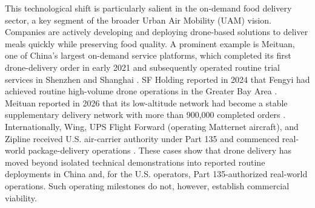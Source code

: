 \documentclass[final,3p,authoryear]{elsarticle}
\begin{document}
This technological shift is particularly salient in the on-demand food delivery sector, a key segment of the broader Urban Air Mobility (UAM) vision.
Companies are actively developing and deploying drone-based solutions to deliver meals quickly while preserving food quality.
\color{blue}
A prominent example is Meituan, one of China's largest on-demand service platforms, which completed its first drone-delivery order in early 2021 and subsequently operated routine trial services in Shenzhen and Shanghai \citep{Meituan2023DroneOperationsHistory}.
SF Holding reported in 2024 that Fengyi had achieved routine high-volume drone operations in the Greater Bay Area \citep{SFHolding2024FengyiOperations}.
Meituan reported in 2026 that its low-altitude network had become a stable supplementary delivery network with more than 900,000 completed orders \citep{Meituan2026DroneOperations}.
Internationally, Wing, UPS Flight Forward (operating Matternet aircraft), and Zipline received U.S. air-carrier authority under Part 135 and commenced real-world package-delivery operations \citep{FAA2026DroneDeliveryPart135}.
These cases show that drone delivery has moved beyond isolated technical demonstrations into reported routine deployments in China and, for the U.S. operators, Part 135-authorized real-world operations.
Such operating milestones do not, however, establish commercial viability.
\end{document}
